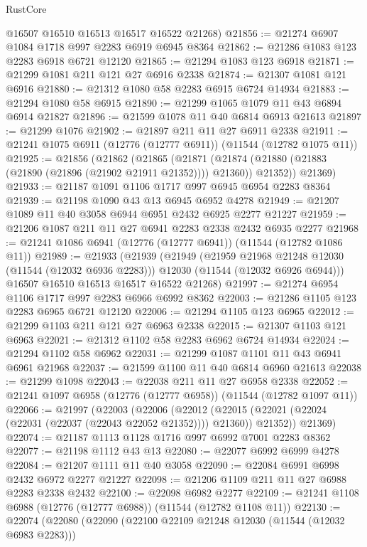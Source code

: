 \begin{lexlean}{RustCore}
\begin{coremodule}
      @16507
      @16510
      @16513
      @16517
      @16522
      @21268)
@21856 := @21274 @6907 @1084 @1718 @997 @2283 @6919 @6945 @8364
@21862 := @21286 @1083 @123 @2283 @6918 @6721 @12120
@21865 := @21294 @1083 @123 @6918
@21871 := @21299 @1081 @211 @121 @27 @6916 @2338
@21874 := @21307 @1081 @121 @6916
@21880 := @21312 @1080 @58 @2283 @6915 @6724 @14934
@21883 := @21294 @1080 @58 @6915
@21890 := @21299 @1065 @1079 @11 @43 @6894 @6914 @21827
@21896 := @21599 @1078 @11 @40 @6814 @6913 @21613
@21897 := @21299 @1076
@21902 := @21897 @211 @11 @27 @6911 @2338
@21911 := @21241 @1075 @6911 (@12776 (@12777 @6911)) (@11544 (@12782 @1075 @11))
@21925 := @21856
    (@21862
      (@21865
        (@21871 (@21874 (@21880 (@21883 (@21890 (@21896 (@21902 @21911 @21352)))) @21360)) @21352))
      @21369)
@21933 := @21187 @1091 @1106 @1717 @997 @6945 @6954 @2283 @8364
@21939 := @21198 @1090 @43 @13 @6945 @6952 @4278
@21949 := @21207 @1089 @11 @40 @3058 @6944 @6951 @2432 @6925 @2277 @21227
@21959 := @21206 @1087 @211 @11 @27 @6941 @2283 @2338 @2432 @6935 @2277
@21968 := @21241 @1086 @6941 (@12776 (@12777 @6941)) (@11544 (@12782 @1086 @11))
@21989 := @21933
    (@21939
      (@21949
        (@21959 @21968 @21248 @12030 (@11544 (@12032 @6936 @2283)))
        @12030
        (@11544 (@12032 @6926 @6944)))
      @16507
      @16510
      @16513
      @16517
      @16522
      @21268)
@21997 := @21274 @6954 @1106 @1717 @997 @2283 @6966 @6992 @8362
@22003 := @21286 @1105 @123 @2283 @6965 @6721 @12120
@22006 := @21294 @1105 @123 @6965
@22012 := @21299 @1103 @211 @121 @27 @6963 @2338
@22015 := @21307 @1103 @121 @6963
@22021 := @21312 @1102 @58 @2283 @6962 @6724 @14934
@22024 := @21294 @1102 @58 @6962
@22031 := @21299 @1087 @1101 @11 @43 @6941 @6961 @21968
@22037 := @21599 @1100 @11 @40 @6814 @6960 @21613
@22038 := @21299 @1098
@22043 := @22038 @211 @11 @27 @6958 @2338
@22052 := @21241 @1097 @6958 (@12776 (@12777 @6958)) (@11544 (@12782 @1097 @11))
@22066 := @21997
    (@22003
      (@22006
        (@22012 (@22015 (@22021 (@22024 (@22031 (@22037 (@22043 @22052 @21352)))) @21360)) @21352))
      @21369)
@22074 := @21187 @1113 @1128 @1716 @997 @6992 @7001 @2283 @8362
@22077 := @21198 @1112 @43 @13
@22080 := @22077 @6992 @6999 @4278
@22084 := @21207 @1111 @11 @40 @3058
@22090 := @22084 @6991 @6998 @2432 @6972 @2277 @21227
@22098 := @21206 @1109 @211 @11 @27 @6988 @2283 @2338 @2432
@22100 := @22098 @6982 @2277
@22109 := @21241 @1108 @6988 (@12776 (@12777 @6988)) (@11544 (@12782 @1108 @11))
@22130 := @22074
    (@22080
      (@22090
        (@22100 @22109 @21248 @12030 (@11544 (@12032 @6983 @2283)))

\end{coremodule}
\end{lexlean}

